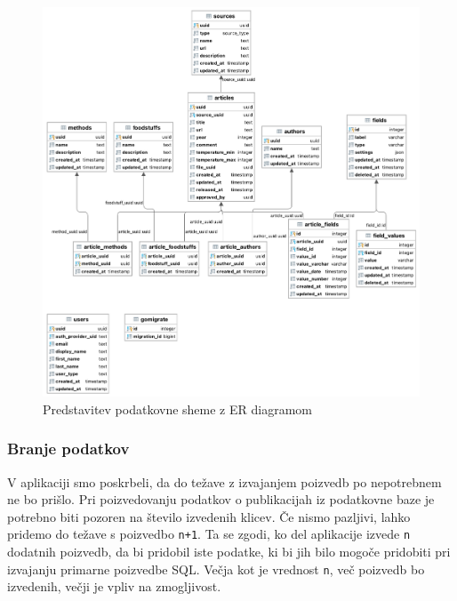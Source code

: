 \documentclass[a4paper, 12pt]{book}
\begin{document}
\begin{figure}[ht]
\begin{center}
\includegraphics[width=1\textwidth]{slike/database-structure.png}
\end{center}
\caption{ Predstavitev podatkovne sheme z ER diagramom }
\label{database-diagram-er}
\end{figure}

\subsubsection{Branje podatkov}
V aplikaciji smo poskrbeli, da do težave z izvajanjem poizvedb po nepotrebnem ne bo prišlo. Pri poizvedovanju podatkov o publikacijah iz podatkovne baze je potrebno biti pozoren na število izvedenih klicev. Če nismo pazljivi, lahko pridemo do težave s poizvedbo \verb=n+1=. Ta se zgodi, ko del aplikacije izvede \verb=n= dodatnih poizvedb, da bi pridobil iste podatke, ki bi jih bilo mogoče pridobiti pri izvajanju primarne poizvedbe SQL. Večja kot je vrednost \verb=n=, več poizvedb bo izvedenih, večji je vpliv na zmogljivost. 

\clearpage
\end{document}
